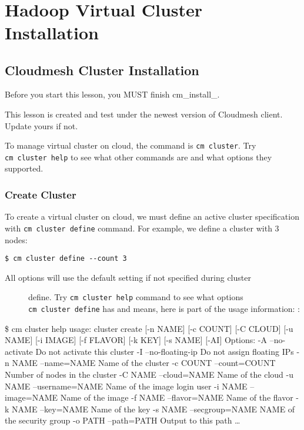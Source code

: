 \FILENAME\
\section{Hadoop Virtual Cluster
Installation}\label{hadoop-virtual-cluster-installation}

\subsection{Cloudmesh Cluster
Installation}\label{cloudmesh-cluster-installation}

Before you start this lesson, you MUST finish cm\_install\_.

This lesson is created and test under the newest version of Cloudmesh
client. Update yours if not.

To manage virtual cluster on cloud, the command is \texttt{cm\ cluster}.
Try \texttt{cm\ cluster\ help} to see what other commands are and what
options they supported.

\subsubsection{Create Cluster}\label{create-cluster}

To create a virtual cluster on cloud, we must define an active cluster
specification with \texttt{cm\ cluster\ define} command. For example, we
define a cluster with 3 nodes:

\begin{verbatim}
$ cm cluster define --count 3
\end{verbatim}

\begin{description}
\item[All options will use the default setting if not specified during
cluster]
define. Try \texttt{cm\ cluster\ help} command to see what options
\texttt{cm\ cluster\ define} has and means, here is part of the usage
information: :
\end{description}

\$ cm cluster help usage: cluster create {[}-n NAME{]} {[}-c COUNT{]}
{[}-C CLOUD{]} {[}-u NAME{]} {[}-i IMAGE{]} {[}-f FLAVOR{]} {[}-k KEY{]}
{[}-s NAME{]} {[}-AI{]} Options: -A --no-activate Do not activate this
cluster -I --no-floating-ip Do not assign floating IPs -n NAME
--name=NAME Name of the cluster -c COUNT --count=COUNT Number of nodes
in the cluster -C NAME --cloud=NAME Name of the cloud -u NAME
--username=NAME Name of the image login user -i NAME --image=NAME Name
of the image -f NAME --flavor=NAME Name of the flavor -k NAME --key=NAME
Name of the key -s NAME --secgroup=NAME NAME of the security group -o
PATH --path=PATH Output to this path \ldots{}

